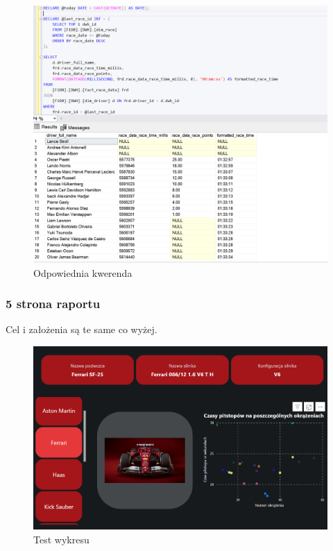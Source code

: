 \documentclass[12pt]{article}
\begin{document}
\begin{figure}[H]
    \centering   \includegraphics[width=\textwidth]{t14.png}
    \caption{Odpowiednia kwerenda}
\end{figure}

\subsubsection*{5 strona raportu}
Cel i założenia są te same co wyżej.
\begin{figure}[H]
    \centering   \includegraphics[width=\textwidth]{t15.png}
    \caption{Test wykresu}
\end{figure}
\end{document}
